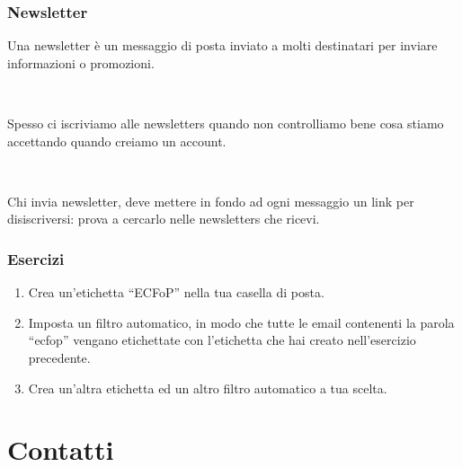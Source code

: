 \documentclass[]{beamer}
\begin{document}
\begin{frame}
\frametitle{Newsletter}
Una \alert{newsletter} è un messaggio di posta inviato a molti destinatari per inviare informazioni o promozioni.\pause

~

Spesso ci iscriviamo alle newsletters quando non controlliamo bene cosa stiamo accettando quando creiamo un account.\pause

~

Chi invia newsletter, deve mettere in fondo ad ogni messaggio un \alert{link per disiscriversi}: prova a cercarlo nelle newsletters che ricevi.

\end{frame}



\begin{frame}
\frametitle{Esercizi}
\begin{enumerate}
  \item Crea un'etichetta ``ECFoP'' nella tua casella di posta.
  \item Imposta un filtro automatico, in modo che tutte le email contenenti la parola ``ecfop'' vengano etichettate con l'etichetta che hai creato nell'esercizio precedente.
  \item Crea un'altra etichetta ed un altro filtro automatico a tua scelta.
\end{enumerate}
\end{frame}



\section{Contatti}
\end{document}
